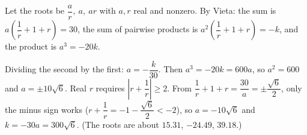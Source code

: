 Let the roots be $\dfrac ar,\ a,\ ar$ with $a,r$ real and nonzero. By Vieta: the sum is $a\left(\dfrac1r+1+r\right)=30$, the sum of pairwise products is $a^2\left(\dfrac1r+1+r\right)=-k$, and the product is $a^3=-20k$.

Dividing the second by the first: $a=-\dfrac k{30}$. Then $a^3=-20k=600a$, so $a^2=600$ and $a=\pm10\sqrt6$. Real $r$ requires $\left|r+\dfrac1r\right|\ge2$. From $\dfrac1r+1+r=\dfrac{30}a=\pm\dfrac{\sqrt6}2$, only the minus sign works ($r+\dfrac1r=-1-\dfrac{\sqrt6}2<-2$), so $a=-10\sqrt6$ and $k=-30a=\boxed{300\sqrt6}$. (The roots are about $15.31$, $-24.49$, $39.18$.)
